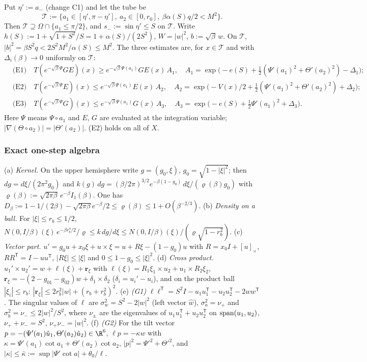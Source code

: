 Put $\eta':=a_-$ (change C1) and let the tube be
\[
\mathcal T:=\{a_1\in[\eta',\pi-\eta'],\ a_2\in[0,r_0],\ \beta\alpha(S)q/2<M^2\}.
\]
Then $\mathcal T\supseteq\Omega\cap\{a_1\le\pi/2\}$, and $s_-:=\sin\eta'\le S$ on $\mathcal T$. Write
$h(S):=1+\sqrt{1+S^2}/S=1+\alpha(S)/(2S^2)$, $W=|w|^2$, $b:=\sqrt\beta\,w$. On $\mathcal T$,
$|b|^2=\beta S^2q<2S^2M^2/\alpha(S)\le M^2$. The three estimates are, for $x\in\mathcal T$ and with
$\Delta_i(\beta)\to0$ uniformly on $\mathcal T$:
\begin{align*}
&\text{(E1)}\quad T(e^{-\sqrt\beta\Psi}GE)(x)\ge e^{-\sqrt\beta\Psi(a_1)}GE(x)\,A_1,\quad
A_1=\exp\big(-e(S)+\tfrac12(\Psi'(a_1)^2+\Theta'(a_2)^2)-\Delta_1\big);\\
&\text{(E2)}\quad T(e^{-\sqrt\beta\Psi}E)(x)\le e^{-\sqrt\beta\Psi(a_1)}E(x)\,A_2,\quad
A_2=\exp\big(-V(x)/2+\tfrac12(\Psi'(a_1)^2+\Theta'(a_2)^2)+\Delta_2\big);\\
&\text{(E3)}\quad T(e^{-\sqrt\beta\Psi}G)(x)\le e^{-\sqrt\beta\Psi(a_1)}G(x)\,A_3,\quad
A_3=\exp\big(-e(S)+\tfrac12\Psi'(a_1)^2+\Delta_3\big).
\end{align*}
Here $\Psi$ means $\Psi\circ a_1$ and $E$, $G$ are evaluated at the integration variable; $|\nabla(\Theta\circ a_2)|=|\Theta'(a_2)|$.
(E2) holds on all of $X$.

\subsubsection*{Exact one-step algebra}

\begin{lemma}\label{tu:L-exact}
(a) \emph{Kernel.} On the upper hemisphere write $g=(g_0,\xi)$, $g_0=\sqrt{1-|\xi|^2}$; then
$dg=d\xi/(2\pi^2g_0)$ and $k(g)\,dg=(\beta/2\pi)^{3/2}e^{-\beta(1-g_0)}\,d\xi/(\varrho(\beta)g_0)$ with
$\varrho(\beta):=\sqrt{2\pi\beta}\,e^{-\beta}I_1(\beta)$. One has
$D_\beta:=1-1/(2\beta)-\sqrt{2\pi\beta}e^{-\beta}/2\le\varrho(\beta)\le1+O(\beta^{-2/3})$.
(b) \emph{Density on a ball.} For $|\xi|\le r_b\le1/2$,
$N(0,I/\beta)(\xi)\,e^{-\beta r_b^4/2}/\varrho\le k\,dg/d\xi\le N(0,I/\beta)(\xi)/(\varrho\sqrt{1-r_b^2})$.
(c) \emph{Vector part.} $u'=g_0u+x_0\xi+u\times\xi=u+R\xi-(1-g_0)u$ with $R=x_0I+[u]_\times$,
$RR^{\mathsf T}=I-uu^{\mathsf T}$, $|R\xi|\le|\xi|$ and $0\le1-g_0\le|\xi|^2$.
(d) \emph{Cross product.} $u_1'\times u_2'=w+\ell(\xi)+\mathbf r_\xi$ with
$\ell(\xi)=R_1\xi_1\times u_2+u_1\times R_2\xi_2$,
$\mathbf r_\xi=-(2-g_{01}-g_{02})w+\delta_1\times\delta_2$ ($\delta_i=u_i'-u_i$), and on the product ball
$|\xi_i|\le r_b$: $|\mathbf r_\xi|\le2r_b^2|w|+(r_b+r_b^2)^2$.
(e) \emph{(G1)} $\ell\ell^{\mathsf T}=S^2I-u_1u_1^{\mathsf T}-u_2u_2^{\mathsf T}-2ww^{\mathsf T}$. The singular values
of $\ell$ are $\sigma_w^2=S^2-2|w|^2$ (left vector $\hat w$), $\sigma_a^2=\nu_+$ and $\sigma_b^2=\nu_-\le2|w|^2/S^2$,
where $\nu_\pm$ are the eigenvalues of $u_1u_1^{\mathsf T}+u_2u_2^{\mathsf T}$ on
${\rm span}(u_1,u_2)$, $\nu_++\nu_-=S^2$, $\nu_+\nu_-=|w|^2$.
(f) \emph{(G2)} For the tilt vector $p=-(\Psi'(a_1)\hat u_1,\Theta'(a_2)\hat u_2)\in\R^6$,
$\ell p=-\kappa w$ with $\kappa=\Psi'(a_1)\cot a_1+\Theta'(a_2)\cot a_2$, $|p|^2=\Psi'^2+\Theta'^2$,
and $|\kappa|\le\bar\kappa:=\sup|\Psi'\cot a|+\theta_0/\ell$.
\end{lemma}

